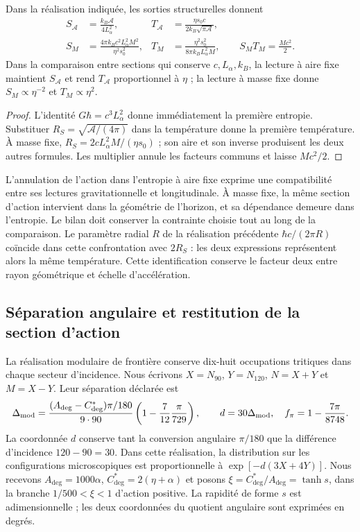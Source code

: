 \begin{proposition}
\label{ins29:vii:area_masa}
Dans la réalisation indiquée, les sorties structurelles donnent
\begin{align*}
 S_{\mathcal A}&=\frac{k_B\mathcal A}{4L_\alpha^2},&
 T_{\mathcal A}&=\frac{\eta s_0c}{2k_B\sqrt{\pi\mathcal A}},\\
 S_M&=\frac{4\pi k_Bc^2L_\alpha^2M^2}{\eta^2s_0^2},&
 T_M&=\frac{\eta^2s_0^2}{8\pi k_BL_\alpha^2M},
 \qquad S_MT_M=\frac{Mc^2}{2}.
\end{align*}
Dans la comparaison entre sections qui conserve \(c,L_\alpha,k_B\),
la lecture à aire fixe maintient \(S_{\mathcal A}\) et rend
\(T_{\mathcal A}\) proportionnel à \(\eta\) ; la lecture à masse fixe
donne \(S_M\propto\eta^{-2}\) et \(T_M\propto\eta^2\).
\end{proposition}
\begin{proof}
L’identité \(G\hbar=c^3L_\alpha^2\) donne immédiatement la première
entropie. Substituer \(R_S=\sqrt{\mathcal A/(4\pi)}\) dans la température
donne la première température. À masse fixe,
\(R_S=2cL_\alpha^2M/(\eta s_0)\) ; son aire et son inverse produisent les
deux autres formules. Les multiplier annule les facteurs communs et laisse
\(Mc^2/2\).
\end{proof}

L’annulation de l’action dans l’entropie à aire fixe exprime une
compatibilité entre ses lectures gravitationnelle et longitudinale. À masse
fixe, la même section d’action intervient dans la géométrie de l’horizon,
et sa dépendance demeure dans l’entropie. Le bilan doit conserver la
contrainte choisie tout au long de la comparaison.
Le paramètre radial \(R\) de la réalisation précédente
\(\hbar c/(2\pi R)\) coïncide dans cette confrontation avec \(2R_S\) :
les deux expressions représentent alors la même température. Cette
identification conserve le facteur deux entre rayon géométrique et échelle
d’accélération.

\subsection{Séparation angulaire et restitution de la section d’action}

La réalisation modulaire de frontière conserve dix-huit occupations
tritiques dans chaque secteur d’incidence. Nous écrivons \(X=N_{90}\),
\(Y=N_{120}\), \(N=X+Y\) et \(M=X-Y\). Leur séparation déclarée est
\[
 \Delta_{\rm mod}=
 \frac{(A_{\deg}-C^*_{\deg})\pi/180}{9\cdot90}
 \left(1-\frac7{12}\frac\pi{729}\right),\qquad
 d=30\Delta_{\rm mod},\quad f_\pi=1-\frac{7\pi}{8748}.
\]
La coordonnée \(d\) conserve tant la conversion angulaire \(\pi/180\)
que la différence d’incidence \(120-90=30\).
Dans cette réalisation, la distribution sur les configurations microscopiques
est proportionnelle à \(\exp[-d(3X+4Y)]\).
Nous recevons \(A_{\deg}=1000\alpha\),
\(C^*_{\deg}=2(\eta+\alpha)\) et posons
\(\xi=C^*_{\deg}/A_{\deg}=\tanh s\), dans la branche
\(1/500<\xi<1\) d’action positive. La rapidité de forme \(s\) est
adimensionnelle ; les deux coordonnées du quotient angulaire sont exprimées
en degrés.

